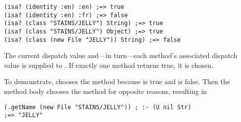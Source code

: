 \begin{verbatim}
(isa? (identity :en) :en) ;=> true
(isa? (identity :en) :fr) ;=> false
(isa? (class "STAINS/JELLY") String) ;=> true
(isa? (class "STAINS/JELLY") Object) ;=> true
(isa? (class (new File "JELLY")) String) ;=> false
\end{verbatim}

The current dispatch value and---in turn---each method's associated dispatch value
is supplied to . If exactly one method returns true, it is chosen.

To demonstrate,
chooses the  method because
is true and
is false. Then the  method body
chooses the  method for opposite reasons,
resulting in 
\begin{verbatim}
(.getName (new File "STAINS/JELLY")) ; :- (U nil Str)
;=> "JELLY"
\end{verbatim}

%
%
%

